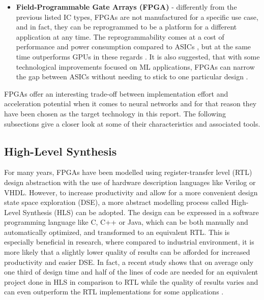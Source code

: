 \begin{itemize}
  \item \textbf{Field-Programmable Gate Arrays (FPGA)} - differently from the previous listed IC types, FPGAs are not manufactured for a specific use case, and in fact, they can be reprogrammed to be a platform for a different application at any time. The reprogrammability comes at a cost of performance and power consumption compared to ASICs \cite{25-boutros2018improve}, but at the same time outperforms GPUs in these regards \cite{27-nurvitadhi2017fpgas, 28-li2018gpu-outperforming}. It is also suggested, that with some technological improvements focused on ML applications, FPGAs can narrow the gap between ASICs without needing to stick to one particular design \cite{25-boutros2018improve, 26-nurvitadhi2016accelerating, 15-nurvitadhi2016accelerating}.

\end{itemize}

FPGAs offer an interesting trade-off between implementation effort and acceleration potential when it comes to neural networks and for that reason they have been chosen as the target technology in this report. The following subsections give a closer look at some of their characteristics and associated tools.

\todofig{|}
\todofig{|}
\todofig{|}

\subsection{High-Level Synthesis}
For many years, FPGAs have been modelled using register-transfer level (RTL) design abstraction with the use of hardware description languages like Verilog or VHDL. However, to increase productivity and allow for a more convenient design state space exploration (DSE), a more abstract modelling process called High-Level Synthesis (HLS) can be adopted. The design can be expressed in a software programming language like C, C++ or Java, which can be both manually and automatically optimized, and transformed to an equivalent RTL. This is especially beneficial in research, where compared to industrial environment, it is more likely that a slightly lower quality of results can be afforded for increased productivity and easier DSE. In fact, a recent study shows that on average only one third of design time and half of the lines of code are needed for an equivalent project done in HLS in comparison to RTL while the quality of results varies and can even outperform the RTL implementations for some applications \cite{30-lahti2019yet?}.

